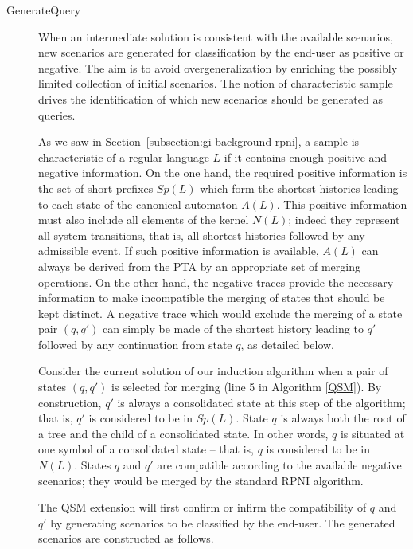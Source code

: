 \begin{description}

\item[GenerateQuery] When an intermediate solution is consistent with the available scenarios, new scenarios are generated for classification by the end-user as positive or negative. The aim is to avoid overgeneralization by enriching the possibly limited collection of initial scenarios. The notion of characteristic sample drives the identification of which new scenarios should be generated as queries. 

As we saw in Section~\ref{subsection:gi-background-rpni}, a sample is characteristic of a regular language $L$ if it contains enough positive and negative information. On the one hand, the required positive information is the set of short prefixes $Sp(L)$ which form the shortest histories leading to each state of the canonical automaton $A(L)$. This positive information must also include all elements of the kernel $N(L)$; indeed they represent all system transitions, that is, all shortest histories followed by any admissible event. If such positive information is available, $A(L)$ can always be derived from the PTA by an appropriate set of merging operations. On the other hand, the negative traces provide the necessary information to make incompatible the merging of states that should be kept distinct. A negative trace which would exclude the merging of a state pair $(q, q')$ can simply be made of the shortest history leading to $q'$ followed by any continuation from state $q$, as detailed below.

Consider the current solution of our induction algorithm when a pair of states $(q, q')$ is selected for merging (line 5 in Algorithm \ref{QSM}). By construction, $q'$ is always a consolidated state at this step of the algorithm; that is, $q'$ is considered to be in $Sp(L)$. State $q$ is always both the root of a tree and the child of a consolidated state. In other words, $q$ is situated at one symbol of a consolidated state -- that is, $q$ is considered to be in $N(L)$. States $q$ and $q'$ are compatible according to the available negative scenarios; they would be merged by the standard RPNI algorithm. 

The QSM extension will first confirm or infirm the compatibility of $q$ and $q'$ by generating scenarios to be classified by the end-user. The generated scenarios are constructed as follows.


\end{description}
